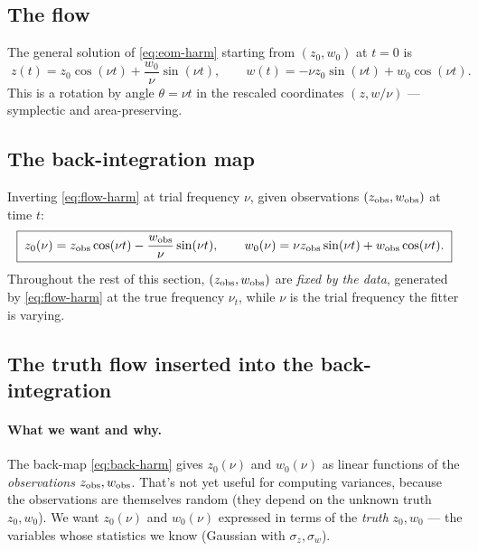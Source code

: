 \documentclass[11pt]{article}
\begin{document}
\subsection{The flow}

The general solution of \eqref{eq:eom-harm} starting from $(z_0,w_0)$ at $t=0$ is
\begin{equation}
\boxed{\;
z(t) = z_0\cos(\nu t) + \frac{w_0}{\nu}\sin(\nu t),\qquad
w(t) = -\nu z_0\sin(\nu t) + w_0\cos(\nu t).
\;}
\label{eq:flow-harm}
\end{equation}
This is a rotation by angle $\theta=\nu t$ in the rescaled coordinates
$(z, w/\nu)$ — symplectic and area-preserving.

\subsection{The back-integration map}

Inverting \eqref{eq:flow-harm} at trial frequency $\nu$, given observations
$(z_{\rm obs},w_{\rm obs})$ at time $t$:
\begin{equation}
\boxed{\;
z_0(\nu) = z_{\rm obs}\cos(\nu t) - \frac{w_{\rm obs}}{\nu}\sin(\nu t),\qquad
w_0(\nu) = \nu z_{\rm obs}\sin(\nu t) + w_{\rm obs}\cos(\nu t).
\;}
\label{eq:back-harm}
\end{equation}
Throughout the rest of this section, $(z_{\rm obs},w_{\rm obs})$ are
\emph{fixed by the data}, generated by \eqref{eq:flow-harm} at the true frequency
$\nu_t$, while $\nu$ is the trial frequency the fitter is varying.

\subsection{The truth flow inserted into the back-integration}

\paragraph{What we want and why.}
The back-map \eqref{eq:back-harm} gives $z_0(\nu)$ and $w_0(\nu)$ as linear functions of
the \emph{observations} $z_{\rm obs}, w_{\rm obs}$. That's not yet useful for computing
variances, because the observations are themselves random (they depend on the unknown
truth $z_0, w_0$). We want $z_0(\nu)$ and $w_0(\nu)$ expressed in terms of the
\emph{truth} $z_0, w_0$ — the variables whose statistics we know (Gaussian with
$\sigma_z, \sigma_w$).
\end{document}

